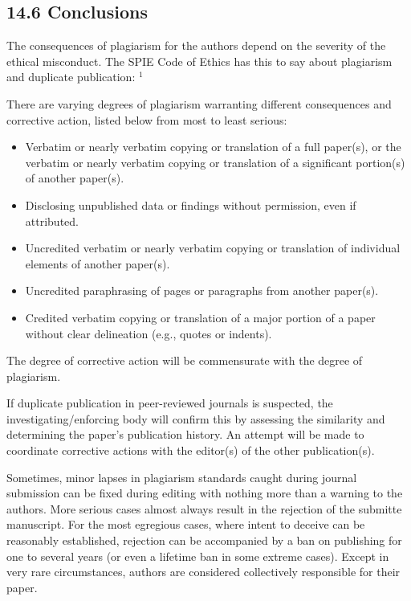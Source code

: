 \subsection*{14.6 Conclusions}
The consequences of plagiarism for the authors depend on the severity of the ethical misconduct. The SPIE Code of Ethics has this to say about plagiarism and duplicate publication: ${ }^{1}$

There are varying degrees of plagiarism warranting different consequences and corrective action, listed below from most to least serious:

\begin{itemize}
  \item Verbatim or nearly verbatim copying or translation of a full paper(s), or the verbatim or nearly verbatim copying or translation of a significant portion(s) of another paper(s).
  \item Disclosing unpublished data or findings without permission, even if attributed.
  \item Uncredited verbatim or nearly verbatim copying or translation of individual elements of another paper(s).
  \item Uncredited paraphrasing of pages or paragraphs from another paper(s).
  \item Credited verbatim copying or translation of a major portion of a paper without clear delineation (e.g., quotes or indents).
\end{itemize}

The degree of corrective action will be commensurate with the degree of plagiarism.

If duplicate publication in peer-reviewed journals is suspected, the investigating/enforcing body will confirm this by assessing the similarity and determining the paper's publication history. An attempt will be made to coordinate corrective actions with the editor(s) of the other publication(s).

Sometimes, minor lapses in plagiarism standards caught during journal submission can be fixed during editing with nothing more than a warning to the authors. More serious cases almost always result in the rejection of the submitte manuscript. For the most egregious cases, where intent to deceive can be reasonably established, rejection can be accompanied by a ban on publishing for one to several years (or even a lifetime ban in some extreme cases). Except in very rare circumstances, authors are considered collectively responsible for their paper.

